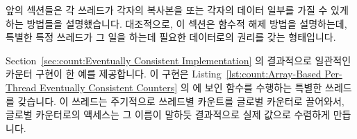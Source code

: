 앞의 섹션들은 각 쓰레드가 각자의 복사본을 또는 각자의 데이터 일부를 가질 수
있게 하는 방법들을 설명했습니다.
대조적으로, 이 섹션은 함수적 해제 방법을 설명하는데, 특별한 특정 쓰레드가 그
일을 하는데 필요한 데이터로의 권리를 갖는 형태입니다.
\begin{fcvref}
Section~\ref{sec:count:Eventually Consistent Implementation} 의 결과적으로
일관적인 카운터 구현이 한 예를 제공합니다.
이 구현은
Listing~\ref{lst:count:Array-Based Per-Thread Eventually Consistent Counters}
의  에 보인  함수를 수행하는 특별한 쓰레드를
갖습니다.
이  쓰레드는 주기적으로 쓰레드별 카운트를 글로벌 카운터로
끌어와서, 글로벌 카운터로의 액세스는 그 이름이 말하듯 결과적으로 실제 값으로
수렴하게 만듭니다.
\end{fcvref}

\iffalse

The earlier sections describe ways of allowing each thread to keep its
own copy or its own portion of the data.
In contrast, this section describes a functional-decomposition approach,
where a special designated thread owns the rights to the data
that is required to do its job.
\begin{fcvref}[ln:count:count_stat_eventual:whole:eventual]
The eventually consistent counter implementation described in
Section~\ref{sec:count:Eventually Consistent Implementation} provides an example.
This implementation has a designated thread that runs the
\co{eventual()} function shown on \clnrefrange{b}{e} of
Listing~\ref{lst:count:Array-Based Per-Thread Eventually Consistent Counters}.
This \co{eventual()} thread periodically pulls the per-thread counts
into the global counter, so that accesses to the global counter will,
as the name says, eventually converge on the actual value.
\end{fcvref}

\fi

